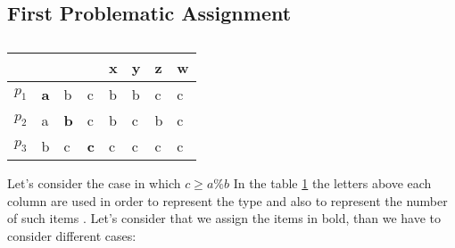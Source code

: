 \documentclass{article}
\begin{document}
\subsection{First Problematic Assignment}
\begin{table}[h]
\centering
\begin{tabular}{|l|l|l|l||l|l|l|l|}
\hline
      &            &            &            & x & y & z & w \\ \hline
$p_1$ & \textbf{a} & b          & c          & b & b & c & c \\ \hline
$p_2$ & a          & \textbf{b} & c          & b & c & b & c \\ \hline
$p_3$ & b          & c          & \textbf{c} & c & c & c & c \\ \hline
\end{tabular}
\caption{}
\label{table-3-players-aab}
\end{table}
Let's consider the case in which $c\ge a\%b$
In the table \ref{table-3-players-aab} the letters above each column are used in order to represent the type and also to represent the number of such items . Let's consider that we assign the items in bold, than we have to consider different cases:
\end{document}
